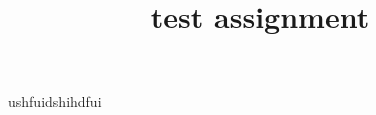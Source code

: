 \documentclass[11pt, letterpaper]{article}
\title{test assignment}
\begin{document}
ushfuidshihdfui
\end{document}
